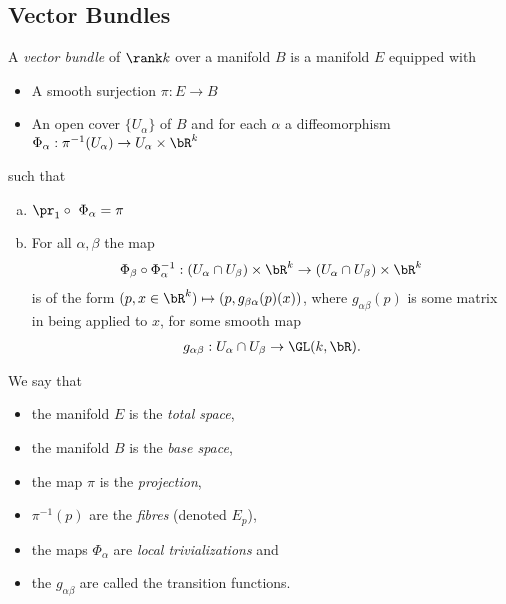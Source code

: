 \subsection{Vector Bundles}
\begin{defn}\label{defn:vector-bundle}
	A \emph{vector bundle} of $\rank k$ over a manifold $B$ is a manifold $E$ equipped with
	\begin{itemize}
		\item A smooth surjection $\pi: E\to B$
		\item An open cover $\{U_\alpha\}$ of $B$ and for each $\alpha$ a diffeomorphism $\Phi_\alpha: \pi^{-1}(U_\alpha) \to U_\alpha\times \bR^k$
	\end{itemize}
	such that
	\begin{enumerate}[(a)]
		\item $\pr_1\circ~\Phi_\alpha = \pi$
		\item For all $\alpha,\beta$ the map
			\begin{align*}
				\Phi_\beta\circ\Phi_\alpha^{-1}: (U_\alpha \cap U_\beta) \times \bR^k \to (U_\alpha \cap U_\beta) \times \bR^k
			\end{align*}
			is of the form $(p,x\in \bR^k) \mapsto (p,g_{\beta\alpha}(p)(x))$, where $g_{\alpha\beta}(p)$ is some matrix in being applied to $x$, for some smooth map
			\begin{align*}
				g_{\alpha\beta}:U_\alpha \cap U_\beta \to \GL(k,\bR).
			\end{align*}
	\end{enumerate}
	We say that
	\begin{itemize}
		\item the manifold $E$ is the \emph{total space},
		\item the manifold $B$ is the \emph{base space},
		\item the map $\pi$ is the \emph{projection},
		\item $\pi^{-1}(p)$ are the \emph{fibres} (denoted $E_p$),
		\item the maps $\Phi_\alpha$ are \emph{local trivializations} and
		\item the $g_{\alpha\beta}$ are called the transition functions.
	\end{itemize}
\end{defn}


